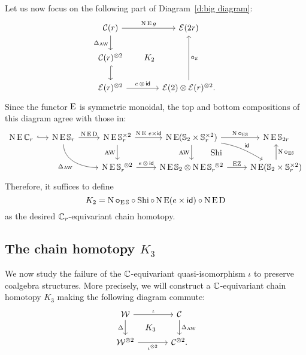 Let us now focus on the following part of Diagram~\eqref{d:big diagram}:
\[
\begin{tikzcd}
	\cC(r)
	\arrow[r,"\chains\EE g"]
	\arrow[d,"\Delta_{\AW}"']
	\arrow[ddr,phantom,"K_2",shift left=0pt]
	&[15pt] \BE(2r)
	\\
	\cC(r)^{\ot 2}
	\arrow[d,hook] & \\
	\BE(r)^{\ot 2}
	\arrow[r,"e\, \ot\, \id"]
	& \BE(2) \ot \BE(r)^{\ot 2}.
	\arrow[uu,"\bcirc_\BE"']
\end{tikzcd}
\]
Since the functor $\operatorname{E}$ is symmetric monoidal, the top and bottom compositions of this diagram agree with those in:
\[
\begin{tikzcd}
	\chains\EE\cyc_r
	\rar[hook]
	&[-10pt]
	\chains\EE\sym_r
	\rar["\chains\EE\rD"]
	\arrow[dr,in=180,out=-90,"\Delta_{\AW}"'] &
	\chains\EE\sym_r^{\times 2}
	\rar["\chains\EE \, e \times \id"]
	\dar["\AW"'] &[0pt]
	\chains\EE(\sym_2 \times \sym_r^{\times 2})
	\rar["\chains\bcirc_{\EE\!\sym}"]
	\dar["\AW"']
	\drar["\id",out=-10,in=150] &
	\chains\EE\sym_{2r} \\ & &
	\chains\EE\sym_r^{\ \ot 2}
	\rar["e \,\ot\, \id"] &
	\chains\EE\sym_2 \ot \chains\EE\sym_r^{\ \ot 2}
	\rar["\EZ"]
	\uar["\Shi",phantom,shift right=30pt] &
	\chains\EE(\sym_2 \times \sym_r^{\times 2})
	\uar["\chains\bcirc_{\EE\!\sym}"']
\end{tikzcd}
\]
Therefore, it suffices to define
\[
K_2 = \operatorname{N}\bm{\circ}_{\operatorname{E}\mathbb{S}} \circ \operatorname{Shi} \circ \operatorname{N}\operatorname{E}(e \times \mathsf{id}) \circ \operatorname{N}\operatorname{E}\mathrm{D}
\]
as the desired $\mathbb{C}_r$-equivariant chain homotopy.

\subsection{The chain homotopy $K_3$} \label{ss:coproduct}

We now study the failure of the $\mathbb{C}$-equivariant quasi-isomorphism $\iota$ to preserve coalgebra structures.
More precisely, we will construct a $\mathbb{C}$-equivariant chain homotopy $K_3$ making the following diagram commute:
\begin{equation}\label{d:coproducts}
	\begin{tikzcd}[column sep=large]
			\cW \arrow[r,"\iota"] \arrow[d,"\Delta"'] \arrow[dr,phantom,"K_3"]&
			\cC \arrow[d,"\Delta_{\AW}"] \\
			\cW^{\ot 2} \arrow[r,"\iota^{\ot 2}"'] &
			\cC^{\ot 2}.
		\end{tikzcd}
\end{equation}


